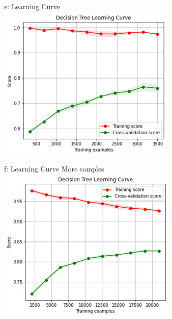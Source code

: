 \documentclass{article}
\begin{document}
\begin{figure}
\begin{subfigure}{.24\textwidth}
	\end{subfigure}
		\begin{subfigure}{.34\textwidth}
		\centering
		e: Learning Curve\\
		\includegraphics[width=\linewidth]{mnist_decision_learning.png}
		
	\end{subfigure}
	\begin{subfigure}{.34\textwidth}
		\centering
		f: Learning Curve More samples\\
		\includegraphics[width=\linewidth]{mnist_decision_learning2.png}
		
	\end{subfigure}
\end{figure}
\end{document}
